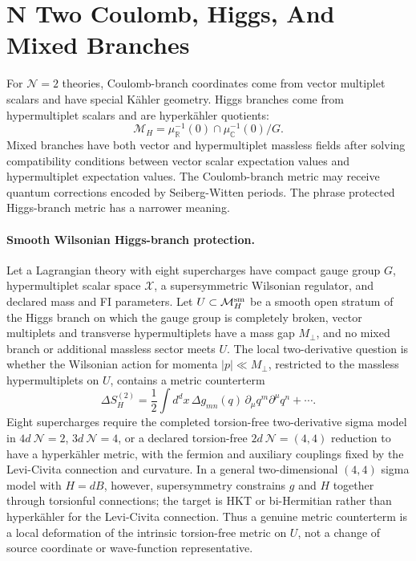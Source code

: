 \section{N Two Coulomb, Higgs, And Mixed Branches}

For \(\mathcal N=2\) theories, Coulomb-branch coordinates come from vector
multiplet scalars and have special K\"ahler geometry.  Higgs branches come from
hypermultiplet scalars and are hyperk\"ahler quotients:
\[
  \mathcal M_H=\mu_\mathbb R^{-1}(0)\cap\mu_\mathbb C^{-1}(0)/G .
\]
Mixed branches have both vector and hypermultiplet massless fields after
solving compatibility conditions between vector scalar expectation values
and hypermultiplet expectation values.  The Coulomb-branch metric may receive
quantum corrections encoded by Seiberg-Witten periods.  The phrase protected
Higgs-branch metric has a narrower meaning.

\paragraph{Smooth Wilsonian Higgs-branch protection.}
Let a Lagrangian theory with eight supercharges have compact gauge group
\(G\), hypermultiplet scalar space \(\mathcal X\), a supersymmetric Wilsonian
regulator, and declared mass and FI parameters.  Let
\(U\subset\mathcal M_H^{\rm sm}\) be a smooth open stratum of the Higgs branch
on which the gauge group is completely broken, vector multiplets and transverse
hypermultiplets have a mass gap \(M_\perp\), and no mixed branch or additional
massless sector meets \(U\).  The local two-derivative question is whether the
Wilsonian action for momenta \(|p|\ll M_\perp\), restricted to the massless
hypermultiplets on \(U\), contains a metric counterterm
\[
  \Delta S^{(2)}_H
  =
  \frac12\int d^dx\,
  \Delta g_{mn}(q)\,
  \partial_\mu q^m\partial^\mu q^n+\cdots .
\]
Eight supercharges require the completed torsion-free two-derivative sigma
model in \(4d\ \mathcal N=2\), \(3d\ \mathcal N=4\), or a declared
torsion-free \(2d\ \mathcal N=(4,4)\) reduction to have a hyperk\"ahler metric,
with the fermion and auxiliary couplings fixed by the Levi-Civita connection and
curvature.  In a general two-dimensional \((4,4)\) sigma model with
\(H=dB\), however, supersymmetry constrains \(g\) and \(H\) together through
torsionful connections; the target is HKT or bi-Hermitian rather than
hyperk\"ahler for the Levi-Civita connection.  Thus a genuine metric counterterm
is a local deformation of the intrinsic torsion-free metric on \(U\), not a
change of source coordinate or wave-function representative.

